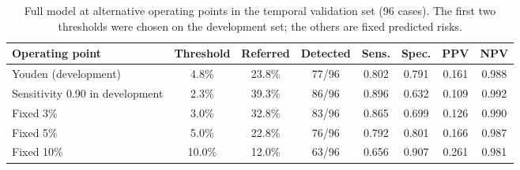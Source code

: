 \documentclass[11pt,a4paper]{article}
\begin{document}
\begin{table}[H]
\centering
\caption{Full model at alternative operating points in the temporal validation set (96 cases). The first two thresholds were chosen on the development set; the others are fixed predicted risks.}
\label{tab:ops}
\small
\setlength{\tabcolsep}{4pt}
\begin{tabular}{lccccccc}
\toprule
Operating point & Threshold & Referred & Detected & Sens. & Spec. & PPV & NPV \\
\midrule
Youden (development) & 4.8\% & 23.8\% & 77/96 & 0.802 & 0.791 & 0.161 & 0.988 \\
Sensitivity 0.90 in development & 2.3\% & 39.3\% & 86/96 & 0.896 & 0.632 & 0.109 & 0.992 \\
Fixed 3\% & 3.0\% & 32.8\% & 83/96 & 0.865 & 0.699 & 0.126 & 0.990 \\
Fixed 5\% & 5.0\% & 22.8\% & 76/96 & 0.792 & 0.801 & 0.166 & 0.987 \\
Fixed 10\% & 10.0\% & 12.0\% & 63/96 & 0.656 & 0.907 & 0.261 & 0.981 \\
\bottomrule
\end{tabular}
\end{table}
\end{document}
